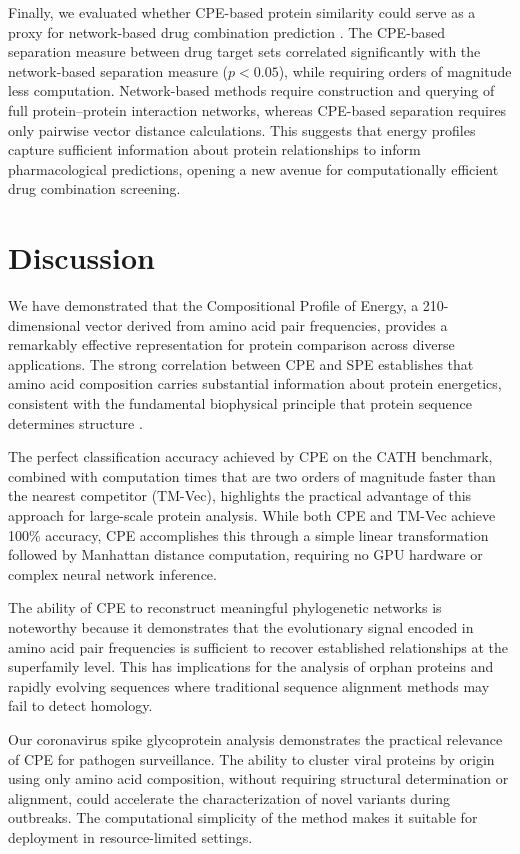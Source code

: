 \documentclass[11pt]{article}
\begin{document}
Finally, we evaluated whether CPE-based protein similarity could serve as a proxy for network-based drug combination prediction \citep{cheng2019}. The CPE-based separation measure between drug target sets correlated significantly with the network-based separation measure ($p < 0.05$), while requiring orders of magnitude less computation. Network-based methods require construction and querying of full protein--protein interaction networks, whereas CPE-based separation requires only pairwise vector distance calculations. This suggests that energy profiles capture sufficient information about protein relationships to inform pharmacological predictions, opening a new avenue for computationally efficient drug combination screening.

\section{Discussion}

We have demonstrated that the Compositional Profile of Energy, a 210-dimensional vector derived from amino acid pair frequencies, provides a remarkably effective representation for protein comparison across diverse applications. The strong correlation between CPE and SPE establishes that amino acid composition carries substantial information about protein energetics, consistent with the fundamental biophysical principle that protein sequence determines structure \citep{cheng2023}.

The perfect classification accuracy achieved by CPE on the CATH benchmark, combined with computation times that are two orders of magnitude faster than the nearest competitor (TM-Vec), highlights the practical advantage of this approach for large-scale protein analysis. While both CPE and TM-Vec achieve 100\% accuracy, CPE accomplishes this through a simple linear transformation followed by Manhattan distance computation, requiring no GPU hardware or complex neural network inference.

The ability of CPE to reconstruct meaningful phylogenetic networks is noteworthy because it demonstrates that the evolutionary signal encoded in amino acid pair frequencies is sufficient to recover established relationships at the superfamily level. This has implications for the analysis of orphan proteins and rapidly evolving sequences where traditional sequence alignment methods may fail to detect homology.

Our coronavirus spike glycoprotein analysis demonstrates the practical relevance of CPE for pathogen surveillance. The ability to cluster viral proteins by origin using only amino acid composition, without requiring structural determination or alignment, could accelerate the characterization of novel variants during outbreaks. The computational simplicity of the method makes it suitable for deployment in resource-limited settings.
\end{document}
